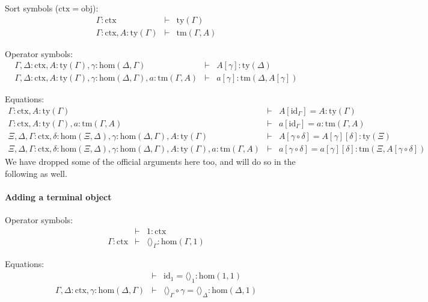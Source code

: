 \documentclass[11pt,a4paper]{article}
\theoremstyle{definition}
\newcommand{\id}{\mathsf{id}}
\def\Obj{\mathrm{obj}}
\def\Hom{\mathrm{hom}}
\def\id{\mathrm{id}}
\newcommand{\ctx}{\mathrm{ctx}}
\newcommand{\ty}{\mathrm{ty}}
\newcommand{\tm}{\mathrm{tm}}
\newcommand{\tuple}[1]{\langle #1 \rangle}
\begin{document}
\begin{tiny}
Sort symbols ($\ctx = \Obj$):
\begin{eqnarray*}
\Gamma : \ctx &\vdash& \ty(\Gamma)\\
\Gamma : \ctx, A:\ty(\Gamma) &\vdash& \tm(\Gamma,A)
\end{eqnarray*}

Operator symbols:
\begin{eqnarray*}
\Gamma,\Delta : \ctx, A:\ty(\Gamma), \gamma : \Hom(\Delta,\Gamma) &\vdash&
A[\gamma] : \ty(\Delta)\\
\Gamma,\Delta : \ctx, A:\ty(\Gamma), \gamma : \Hom(\Delta,\Gamma), a:\tm(\Gamma,A) &\vdash&  a[\gamma] : \tm(\Delta,A[\gamma])
\end{eqnarray*}

Equations:
\begin{eqnarray*}
\Gamma : \ctx, A:\ty(\Gamma) &\vdash& A[\id_\Gamma] = A : \ty(\Gamma)\\
\Gamma : \ctx, A:\ty(\Gamma), a:\tm(\Gamma,A) &\vdash& a[\id_\Gamma] = a : \tm(\Gamma,A)\\
\Xi,\Delta,\Gamma : \ctx, \delta : \Hom(\Xi,\Delta), \gamma : \Hom(\Delta,\Gamma),
A:\ty(\Gamma) &\vdash& A[\gamma\circ\delta] = A[\gamma][\delta]: \ty(\Xi)\\
\Xi,\Delta,\Gamma : \ctx, \delta : \Hom(\Xi,\Delta), \gamma : \Hom(\Delta,\Gamma),
A:\ty(\Gamma), a:\tm(\Gamma,A) &\vdash&
a[\gamma\circ\delta] = a[\gamma][\delta]: \tm(\Xi,A[\gamma\circ\delta])
\end{eqnarray*}
We have dropped some of the official arguments here too, and will do so in the following as well.
\end{tiny}


\paragraph{Adding a terminal object}

\begin{tiny}
Operator symbols:
\begin{eqnarray*}
&\vdash& 1 : \ctx\\
\Gamma : \ctx &\vdash& \tuple{}_\Gamma : \Hom(\Gamma,1)
\end{eqnarray*}

Equations:
\begin{eqnarray*}
 &\vdash& \id_1 = \tuple{}_1 : \Hom(1,1)\\
\Gamma,\Delta : \ctx, \gamma : \Hom(\Delta,\Gamma) &\vdash&
\tuple{}_\Gamma\circ\gamma = \tuple{}_\Delta : \Hom(\Delta,1)
\end{eqnarray*}
\end{tiny}
\end{document}
